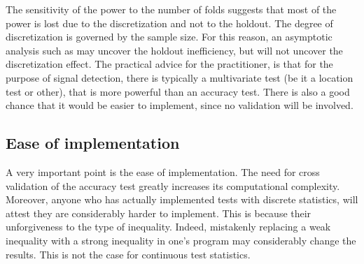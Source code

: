\documentclass[12pt,a4paper]{article}
\begin{document}
The sensitivity of the power to the number of folds suggests that most of the power is lost due to the discretization and not to the holdout. 
The degree of discretization is governed by the sample size. 
For this reason, an asymptotic analysis such as \cite{ramdas_classification_2016} may uncover the holdout inefficiency, but will not uncover the discretization effect. 
The practical advice for the practitioner, is that for the purpose of signal detection, there is typically a multivariate test (be it a location test or other), that is more powerful than an accuracy test. 
There is also a good chance that it would be easier to implement, since no validation will be involved. 



\subsection{Ease of implementation}
A very important point is the ease of implementation. 
The need for cross validation of the accuracy test greatly increases its computational complexity. 
Moreover, anyone who has actually implemented tests with discrete statistics, will attest they are considerably harder to implement. This is because their unforgiveness to the type of inequality. 
Indeed, mistakenly replacing a weak inequality with a strong inequality in one's program may considerably change the results. 
This is not the case for continuous test statistics. 
\end{document}
